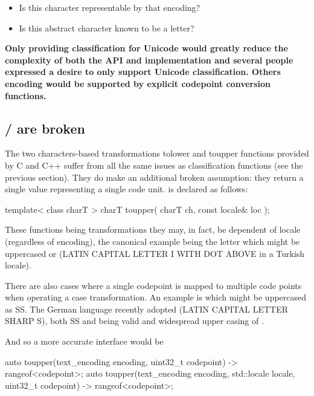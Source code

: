 \documentclass{wg21}
\newcommand{\UnicodeLetter}[1]{\textbf{\textcolor{BrickRed}{\Large\tcode{#1}}}}
\begin{document}
\begin{itemize}
\item Is this character representable by that encoding?
\item Is this abstract character known to be a letter?
\end{itemize}


\textbf{Only providing classification for Unicode would greatly reduce the complexity of both the API and implementation and several
people expressed a desire to only support Unicode classification. Others encoding would be supported by explicit codepoint conversion functions.}

\subsection{/ are broken}

The two characters-based transformations tolower and toupper functions provided by C and C++ suffer from all the same issues as classification functions (see the previous section).
They do make an additional broken assumption:
they return a single value representing a single code unit.  is declared as follows:

\begin{codeblock}
template< class charT >
charT toupper( charT ch, const locale& loc );
\end{codeblock}

These functions being transformations they may, in fact, be dependent of locale (regardless of encoding),
the canonical example being the letter \UnicodeLetter{i} which might be uppercased \UnicodeLetter{I} or \UnicodeLetter{İ} (LATIN CAPITAL LETTER I WITH DOT ABOVE in a Turkish locale).

There are also cases where a single codepoint is mapped to multiple code points when operating a case transformation.
An example is \UnicodeLetter{ß} which might be uppercased as SS. The German language recently adopted \UnicodeLetter{ẞ} (LATIN CAPITAL LETTER SHARP S), both SS and \UnicodeLetter{ẞ} being valid and widespread upper casing of \UnicodeLetter{ß}.

And so a more accurate interface would be

\begin{codeblock}
auto toupper(text_encoding encoding, 
uint32_t codepoint) -> rangeof<codepoint>;
auto toupper(text_encoding encoding, std::locale locale, uint32_t codepoint) -> rangeof<codepoint>;
\end{codeblock}
\end{document}
